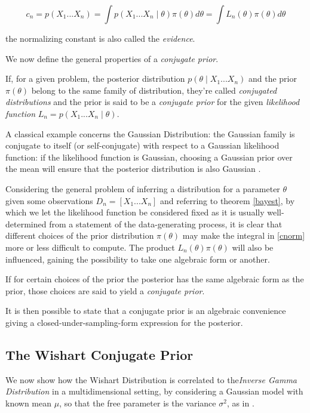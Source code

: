 \documentclass[12pt,openright,twoside,a4paper]{book}
\begin{document}
\begin{equation}
c_n=p(X_1...X_n)=\int p(X_1...X_n\mid \theta)\pi(\theta)d\theta=\int L_n(\theta)\pi(\theta)d\theta
\label{cnorm}
\end{equation}

the normalizing constant is also called the \textit{evidence}.

We now define the general properties of a \textit{conjugate prior}.

If, for a given problem, the posterior distribution $p(\theta\mid X_1...X_n)$ and the prior $\pi(\theta)$ belong to the same family of distribution, they're called \textit{conjugated distributions} and the prior is said to be a \textit{conjugate prior} for the given \textit{likelihood function} $L_n=p(X_1...X_n\mid \theta)$.

A classical example concerns the Gaussian Distribution: the Gaussian family is conjugate to itself (or self-conjugate) with respect to a Gaussian likelihood function: if the likelihood function is Gaussian, choosing a Gaussian prior over the mean will ensure that the posterior distribution is also Gaussian \cite{CBA}.

Considering the general problem of inferring a distribution for a parameter $\theta$ given some observations $D_n=[X_1...X_n]$ and referring to theorem \ref{bayest}, by which we let the likelihood function be considered fixed as it is usually well-determined from a statement of the data-generating process,  it is clear that different choices of the prior distribution $\pi(\theta)$ may make the integral in \ref{cnorm} more or less difficult to compute.
The product $L_n(\theta)\pi(\theta)$ will also be influenced, gaining the possibility to take one algebraic form or another.

If for certain choices of the prior the posterior has the same algebraic form as the prior, those choices are said to yield a \textit{conjugate prior}.

It is then possible to state that a conjugate prior is an algebraic convenience giving a closed-under-sampling-form expression for the posterior.

\subsection{The Wishart Conjugate Prior}

We now show how the Wishart Distribution is correlated to the\textit{Inverse Gamma Distribution} in a multidimensional setting, by  considering a Gaussian model with known mean $\mu$, so that the free parameter is the variance  $\sigma^2$, as in \cite{SML}.
\end{document}
